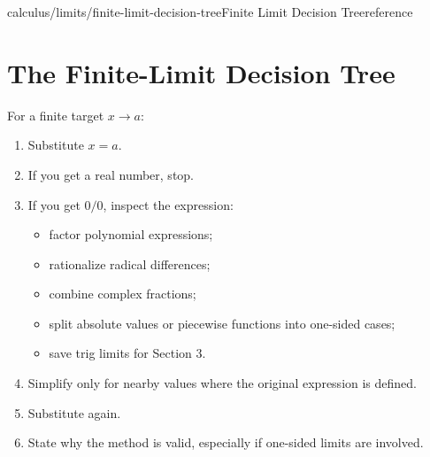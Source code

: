 \begin{webpage}{calculus/limits/finite-limit-decision-tree}{Finite Limit Decision Tree}{reference}
\section{The Finite-Limit Decision Tree}

\begin{bgmethod}[title={A Repeatable Homework Procedure}]
For a finite target \(x\to a\):
\begin{enumerate}
  \item Substitute \(x=a\).
  \item If you get a real number, stop.
  \item If you get \(0/0\), inspect the expression:
  \begin{itemize}
    \item factor polynomial expressions;
    \item rationalize radical differences;
    \item combine complex fractions;
    \item split absolute values or piecewise functions into one-sided cases;
    \item save trig limits for Section 3.
  \end{itemize}
  \item Simplify only for nearby values where the original expression is defined.
  \item Substitute again.
  \item State why the method is valid, especially if one-sided limits are involved.
\end{enumerate}
\end{bgmethod}
\end{webpage}

